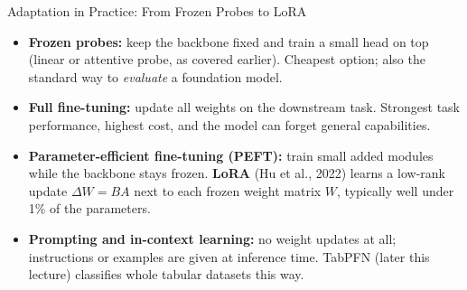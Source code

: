 \begin{frame}{Adaptation in Practice: From Frozen Probes to LoRA}
  \begin{itemize}\itemsep0.28em
    \item \textbf{Frozen probes:} keep the backbone fixed and train a small head on top (linear or attentive probe, as covered earlier). Cheapest option; also the standard way to \emph{evaluate} a foundation model.
    \item \textbf{Full fine-tuning:} update all weights on the downstream task. Strongest task performance, highest cost, and the model can forget general capabilities.
    \item \textbf{Parameter-efficient fine-tuning (PEFT):} train small added modules while the backbone stays frozen. \textbf{LoRA} (Hu et al., 2022) learns a low-rank update $\Delta W = BA$ next to each frozen weight matrix $W$, typically well under 1\% of the parameters.
    \item \textbf{Prompting and in-context learning:} no weight updates at all; instructions or examples are given at inference time. TabPFN (later this lecture) classifies whole tabular datasets this way.
  \end{itemize}
\end{frame}
